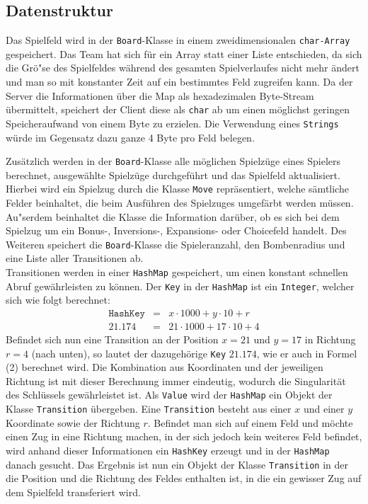 \newpage

\subsection{Datenstruktur}\label{subsec:datenstruktur}
Das Spielfeld wird in der \texttt{Board}-Klasse in einem zweidimensionalen \texttt{char-Array} gespeichert.
Das Team hat sich f\"ur ein Array statt einer Liste entschieden, da sich die Gr\"o"se des Spielfeldes w\"ahrend des gesamten Spielverlaufes nicht mehr \"andert und man so mit konstanter Zeit auf ein bestimmtes Feld zugreifen kann.
Da der Server die Informationen \"uber die Map als hexadezimalen Byte-Stream \"ubermittelt, speichert der Client diese als \texttt{char} ab um einen m\"oglichst geringen Speicheraufwand von einem Byte zu erzielen.
Die Verwendung eines \texttt{Strings} w\"urde im Gegensatz dazu ganze 4 Byte pro Feld belegen.

Zus\"atzlich werden in der \texttt{Board}-Klasse alle m\"oglichen Spielz\"uge eines Spielers berechnet, ausgew\"ahlte Spielz\"uge durchgef\"uhrt und das Spielfeld aktualisiert.
Hierbei wird ein Spielzug durch die Klasse \texttt{Move} repr\"asentiert, welche s\"amtliche Felder beinhaltet, die beim Ausf\"uhren des Spielzuges umgef\"arbt werden m\"ussen.
Au"serdem beinhaltet die Klasse die Information dar\"uber, ob es sich bei dem Spielzug um ein Bonus-, Inversions-, Expansions- oder Choicefeld handelt.
Des Weiteren speichert die \texttt{Board}-Klasse die Spieleranzahl, den Bombenradius und eine Liste aller Transitionen ab. \\
Transitionen werden in einer \texttt{HashMap} gespeichert, um einen konstant schnellen Abruf gew\"ahr\-leisten zu k\"onnen.
Der \texttt{Key} in der \texttt{HashMap} ist ein \texttt{Integer}, welcher sich wie folgt berechnet:
\begin{align}
    \texttt{HashKey} &=& x \cdot 1000 + y \cdot 10 + r \\
    21.174 &=& 21 \cdot 1000 + 17 \cdot 10 + 4
\end{align}
Befindet sich nun eine Transition an der Position $x=21$ und $y=17$ in Richtung $r=4$ (nach unten), so lautet der dazugeh\"orige \texttt{Key} $21.174$, wie er auch in Formel (2) berechnet wird.
Die Kombination aus Koordinaten und der jeweiligen Richtung ist mit dieser Berechnung immer eindeutig, wodurch die Singularit\"at des Schl\"ussels gew\"ahrleistet ist.
Als \texttt{Value} wird der \texttt{HashMap} ein Objekt der Klasse \texttt{Transition} \"ubergeben.
Eine \texttt{Transition} besteht aus einer $x$ und einer $y$ Koordinate sowie der Richtung $r$.
Befindet man sich auf einem Feld und m\"ochte einen Zug in eine Richtung machen, in der sich jedoch kein weiteres Feld befindet, wird anhand dieser Informationen ein \texttt{HashKey} erzeugt und in der \texttt{HashMap} danach gesucht.
Das Ergebnis ist nun ein Objekt der Klasse \texttt{Transition} in der die Position und die Richtung des Feldes enthalten ist, in die ein gewisser Zug auf dem Spielfeld transferiert wird.

